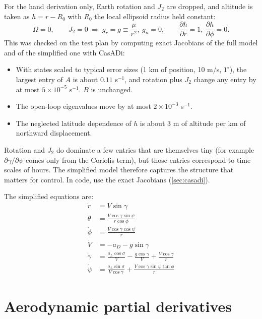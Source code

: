 \documentclass[11pt]{report}
\numberwithin{equation}{chapter}
\newcommand{\pd}[2]{\frac{\partial #1}{\partial #2}}
\newcommand{\aL}{a_L}
\newcommand{\aD}{a_D}
\begin{document}
For the hand derivation only, Earth rotation and $J_2$ are dropped, and altitude is taken
as $h = r - R_0$ with $R_0$ the local ellipsoid radius held constant:
\begin{equation}
  \Omega = 0,\qquad J_2 = 0\ \Rightarrow\ g_r = g \equiv \frac{\mu}{r^2},\ g_n = 0,\qquad
  \pd{h}{r} = 1,\ \pd{h}{\phi} = 0 .
\end{equation}
This was checked on the test plan by computing exact Jacobians of the full model and of the
simplified one with CasADi:
\begin{itemize}
\item With states scaled to typical error sizes (1 km of position, 10 m/s, $1^\circ$), the
  largest entry of $A$ is about $0.11$ s$^{-1}$, and rotation plus $J_2$ change any entry by at
  most $5\times10^{-5}$ s$^{-1}$. $B$ is unchanged.
\item The open-loop eigenvalues move by at most $2\times10^{-3}$ s$^{-1}$.
\item The neglected latitude dependence of $h$ is about 3 m of altitude per km of northward
  displacement.
\end{itemize}
Rotation and $J_2$ do dominate a few entries that are themselves tiny (for example
$\partial\dot\gamma/\partial\psi$ comes only from the Coriolis term), but those entries
correspond to time scales of hours. The simplified model therefore captures the structure
that matters for control. In code, use the exact Jacobians (\cref{sec:casadi}).

The simplified equations are:
\begin{align}
  \dot r &= V\sin\gamma \label{eq:s_r}\\
  \dot\theta &= \frac{V\cos\gamma\sin\psi}{r\cos\phi} \\
  \dot\phi &= \frac{V\cos\gamma\cos\psi}{r} \\
  \dot V &= -\aD - g\sin\gamma \label{eq:s_V}\\
  \dot\gamma &= \frac{\aL\cos\sigma}{V} - \frac{g\cos\gamma}{V} + \frac{V\cos\gamma}{r} \label{eq:s_g}\\
  \dot\psi &= \frac{\aL\sin\sigma}{V\cos\gamma} + \frac{V\cos\gamma\sin\psi\tan\phi}{r} \label{eq:s_p}
\end{align}

\section{Aerodynamic partial derivatives}
\end{document}
